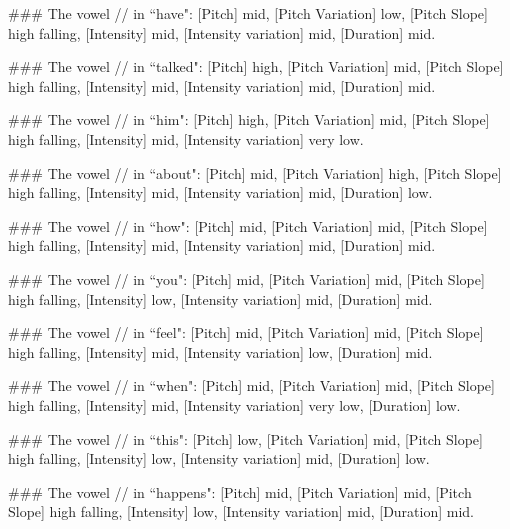 \begin{tcolorbox}[blue_box, title = {{Example: Vowel-level Acoustic Feature}}]
\#\#\# The vowel // in ``have": [Pitch] mid, [Pitch Variation] low, [Pitch Slope] high falling, [Intensity] mid, [Intensity variation] mid, [Duration] mid.

\#\#\# The vowel // in ``talked": [Pitch] high, [Pitch Variation] mid, [Pitch Slope] high falling, [Intensity] mid, [Intensity variation] mid, [Duration] mid.

\#\#\# The vowel // in ``him": [Pitch] high, [Pitch Variation] mid, [Pitch Slope] high falling, [Intensity] mid, [Intensity variation] very low.

\#\#\# The vowel // in ``about": [Pitch] mid, [Pitch Variation] high, [Pitch Slope] high falling, [Intensity] mid, [Intensity variation] mid, [Duration] low.

\#\#\# The vowel // in ``how": [Pitch] mid, [Pitch Variation] mid, [Pitch Slope] high falling, [Intensity] mid, [Intensity variation] mid, [Duration] mid.

\#\#\# The vowel // in ``you": [Pitch] mid, [Pitch Variation] mid, [Pitch Slope] high falling, [Intensity] low, [Intensity variation] mid, [Duration] mid.

\#\#\# The vowel // in ``feel": [Pitch] mid, [Pitch Variation] mid, [Pitch Slope] high falling, [Intensity] mid, [Intensity variation] low, [Duration] mid.

\#\#\# The vowel // in ``when": [Pitch] mid, [Pitch Variation] mid, [Pitch Slope] high falling, [Intensity] mid, [Intensity variation] very low, [Duration] low.

\#\#\# The vowel // in ``this": [Pitch] low, [Pitch Variation] mid, [Pitch Slope] high falling, [Intensity] low, [Intensity variation] mid, [Duration] low.

\#\#\# The vowel // in ``happens": [Pitch] mid, [Pitch Variation] mid, [Pitch Slope] high falling, [Intensity] low, [Intensity variation] mid, [Duration] mid.

\end{tcolorbox}
